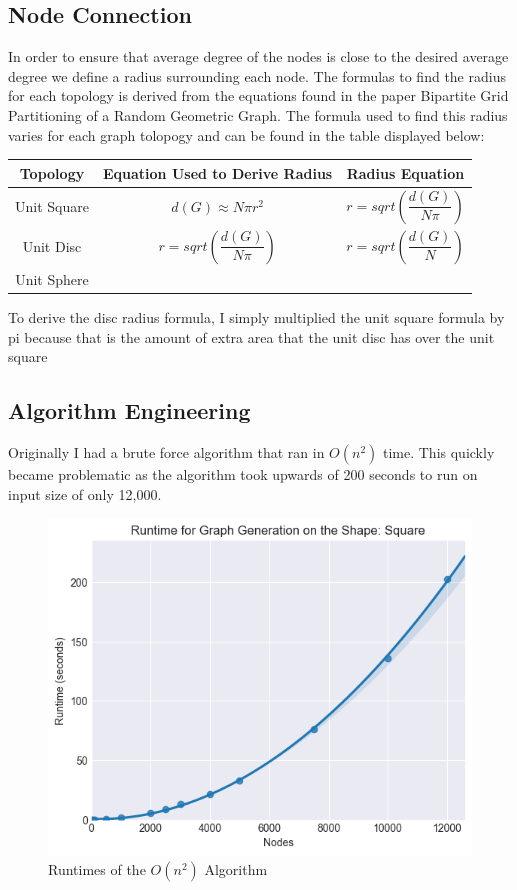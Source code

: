 \documentclass{article}
\begin{document}
    \subsection{Node Connection}
    In order to ensure that average degree of the nodes is close to the desired average degree we define a radius surrounding each node.
    The formulas to find the radius for each topology is derived from the equations found in the paper Bipartite Grid Partitioning of a Random Geometric Graph\cite{chen2017bipartite}.
    The formula used to find this radius varies for each graph tolopogy and can be found in the table displayed below:

    \begin{tabular}{ |c|c|c| }
  	  \hline
  	  Topology & Equation Used to Derive Radius & Radius Equation \\
  	  \hline
  	  Unit Square & $d(G) \approx N\pi r^2 $ & $r = sqrt(\dfrac{d(G)}{N\pi})$ \\
  	  \hline
  	  Unit Disc & $r = sqrt(\dfrac{d(G)}{N\pi})$ & $r = sqrt(\dfrac{d(G)}{N})$ \\
  	  \hline
  	  Unit Sphere & & \\
  	  \hline
    \end{tabular}

    To derive the disc radius formula, I simply multiplied the unit square formula by pi because that is the amount of extra area that the unit disc has over the unit square

	  \subsection{Algorithm Engineering}
	  Originally I had a brute force algorithm that ran in $O(n^2)$ time.
	  This quickly became problematic as the algorithm took upwards of 200 seconds to run on input size of only 12,000.
	  \begin{figure}[H]
		\centering
		\includegraphics[width=1 \textwidth]{square/runtime/runtime_chart_naive}
		\caption{Runtimes of the $O(n^2)$ Algorithm}
	  \end{figure}
\end{document}
